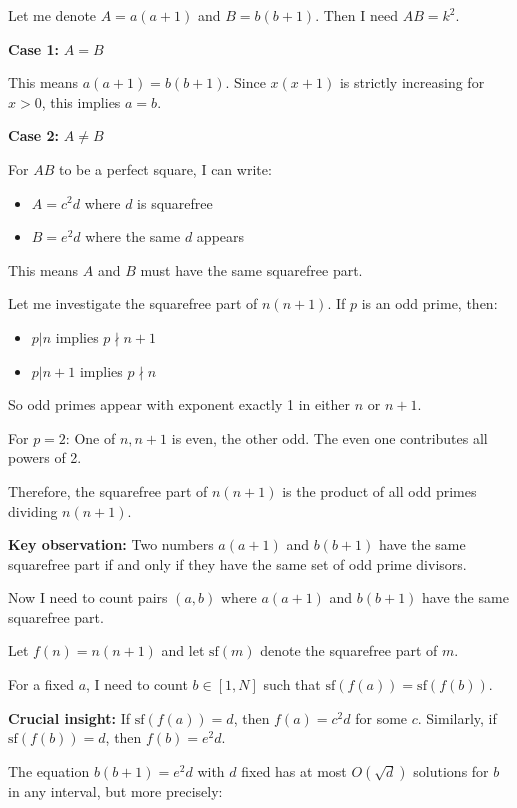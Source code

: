 \documentclass[12pt,a4paper]{article}
\theoremstyle{definition}
\begin{document}
    Let me denote $A = a(a+1)$ and $B = b(b+1)$. Then I need $AB = k^2$.

    \textbf{Case 1:} $A = B$

    This means $a(a+1) = b(b+1)$. Since $x(x+1)$ is strictly increasing for $x > 0$, this implies $a = b$.

    \textbf{Case 2:} $A \neq B$

    For $AB$ to be a perfect square, I can write:
    \begin{itemize}
        \item $A = c^2 d$ where $d$ is squarefree
        \item $B = e^2 d$ where the same $d$ appears
    \end{itemize}

    This means $A$ and $B$ must have the same squarefree part.

    Let me investigate the squarefree part of $n(n+1)$. If $p$ is an odd prime, then:
    \begin{itemize}
        \item $p | n$ implies $p \nmid n+1$
        \item $p | n+1$ implies $p \nmid n$
    \end{itemize}

    So odd primes appear with exponent exactly 1 in either $n$ or $n+1$.

    For $p = 2$: One of $n, n+1$ is even, the other odd. The even one contributes all powers of 2.

    Therefore, the squarefree part of $n(n+1)$ is the product of all odd primes dividing $n(n+1)$.

    \textbf{Key observation:} Two numbers $a(a+1)$ and $b(b+1)$ have the same squarefree part if and only if they have the same set of odd prime divisors.

    Now I need to count pairs $(a,b)$ where $a(a+1)$ and $b(b+1)$ have the same squarefree part.

    Let $f(n) = n(n+1)$ and let $\text{sf}(m)$ denote the squarefree part of $m$.

    For a fixed $a$, I need to count $b \in [1,N]$ such that $\text{sf}(f(a)) = \text{sf}(f(b))$.

    \textbf{Crucial insight:} If $\text{sf}(f(a)) = d$, then $f(a) = c^2 d$ for some $c$. Similarly, if $\text{sf}(f(b)) = d$, then $f(b) = e^2 d$.

    The equation $b(b+1) = e^2 d$ with $d$ fixed has at most $O(\sqrt{d})$ solutions for $b$ in any interval, but more precisely:
\end{document}
